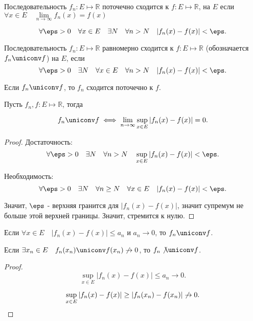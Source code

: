 \begin{definition} \thmslashn 
    
    Последовательность $f_{n} : E \mapsto \mathbb{R}$ поточечно сходится к $f : E \mapsto \mathbb{R}$, на $E$ если $\forall{x\in E}\quad \lim\limits_{n \to \infty} f_{n}(x) = f(x)$

\[ \forall{\eps > 0}\quad \forall{x\in E}\quad \exists{N}\quad \forall{n > N}\quad |f_{n}(x) - f(x)| < \eps .\] 
    
\end{definition}
\begin{definition} \thmslashn 

    Последовательность $f_{n} : E \mapsto \mathbb{R}$ равномерно сходится к $f : E \mapsto \mathbb{R}$ (обозначается $f_{n} \uniconv  f$) на $E$, если
    \[ \forall{\eps > 0}\quad \exists{N}\quad \forall{x\in E}\quad \forall{n > N}\quad |f_{n}(x) - f(x)| < \eps .\] 
\end{definition}
\begin{remark} \thmslashn

    Если $f_{n} \uniconv f$, то $f_{n}$ сходится поточечно к $f$.
\end{remark}
\begin{theorem} \thmslashn

    Пусть $f_{n}, f : E \mapsto \mathbb{R}$, тогда

    \[ f_{n} \uniconv f \iff \lim\limits_{n \to \infty} \sup\limits_{x\in E} |f_{n}(x) - f(x)| = 0 .\]
    \begin{proof} \thmslashn
    
        Достаточность:
        \[ \forall{\eps > 0}\quad \exists{N}\quad \forall{n > N}\quad \sup\limits_{x\in E} |f_{n}(x) - f(x)| < \eps  .\]  

        Необходимость:
        \[ \forall{\eps > 0}\quad \exists{N}\quad \forall{n \ge N}\quad \forall{x\in E}\quad |f_{n}(x) - f(x)| < \eps .\]

        Значит, $\eps$ - верхняя гранится для $|f_{n}(x) - f(x)|$, значит супремум не больше этой верхней границы. Значит, стремится к нулю.
    \end{proof}
\end{theorem}
\begin{consequence} \thmslashn

    Если $\forall{x\in E}\quad |f_{n}(x) - f(x)| \le a_{n}$ и $a_{n} \to 0$, то $f_{n} \uniconv f$.

    Если $\exists{x_{n}\in E}\quad f_{n}(x_{n}) \uniconv f(x_{n}) \not\to 0$, то $f_{n} \not\uniconv f$.
    \begin{proof} \thmslashn
    
        \[ \sup\limits_{x\in E} |f_{n}(x) - f(x)| \le a_{n} \to 0 .\]

        \[ \sup\limits_{x\in E} |f_{n}(x) - f(x)| \ge |f_{n}(x_{n}) - f(x_{n})| \not\to 0 .\qedhere\] 
    \end{proof}
\end{consequence}
